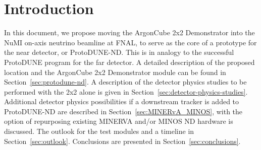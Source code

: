 \section{Introduction}
\label{sec:introduction}

In this document, we propose moving the ArgonCube 2x2 Demonstrator into the NuMI on-axis neutrino beamline at FNAL, to serve as the core of a prototype for the near detector, or ProtoDUNE-ND. This is in analogy to the successful ProtoDUNE program for the far detector. A detailed description of the proposed location and the ArgonCube 2x2 Demonstrator module can be found in Section~\ref{sec:protodune-nd}. A description of the detector physics studies to be performed with the 2x2 alone is given in Section~\ref{sec:detector-physics-studies}. Additional detector physics possibilities if a downstream tracker is added to ProtoDUNE-ND are described in Section~\ref{sec:MINERvA_MINOS}, with the option of repurposing existing MINERVA and/or MINOS ND hardware is discussed. The outlook for the test modules and a timeline in Section~\ref{sec:outlook}. Conclusions are presented in Section~\ref{sec:conclusions}.

